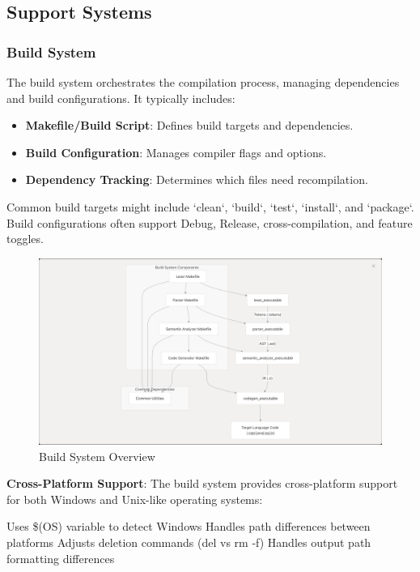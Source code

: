 \documentclass[conference]{IEEEtran}
\begin{document}
\subsection{Support Systems}

\subsubsection{Build System}
The build system orchestrates the compilation process, managing dependencies and build configurations. It typically includes: %
\begin{itemize}
    \item \textbf{Makefile/Build Script}: Defines build targets and dependencies.
    \item \textbf{Build Configuration}: Manages compiler flags and options.
    \item \textbf{Dependency Tracking}: Determines which files need recompilation.
\end{itemize}
Common build targets might include `clean`, `build`, `test`, `install`, and `package`. Build configurations often support Debug, Release, cross-compilation, and feature toggles.
\begin{figure}[H]
    \centering
    \includegraphics[width=1\linewidth]{buildsys.png}
    \caption{Build System Overview}
    \label{fig:enter-label}
\end{figure}

\textbf{Cross-Platform Support}:
The build system provides cross-platform support for both Windows and Unix-like operating systems:

Uses \$(OS) variable to detect Windows
Handles path differences between platforms
Adjusts deletion commands (del vs rm -f)
Handles output path formatting differences
\end{document}
